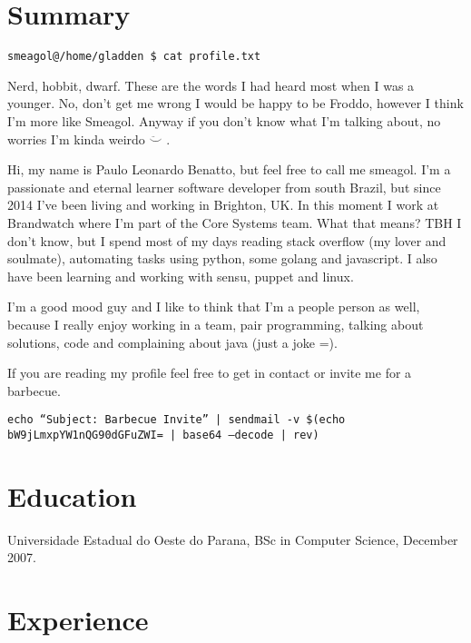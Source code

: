 \documentclass[margin]{res}
\begin{document}
  

\address{Brighton, UK \\ benatto@gmail.com \\ Phone: +44 07533998484 \\ Post Code: BN1 6AQ }

                        
\begin{resume}                        

\section{Summary} \texttt{smeagol@/home/gladden \$ cat profile.txt}

Nerd, hobbit, dwarf. These are the words I had heard most when I was a younger.
No, don't get me wrong I would be happy to be Froddo, however I think I'm more
like Smeagol. Anyway if you don't know what I'm talking about, no worries
I'm kinda weirdo $\ddot\smile$ .

Hi, my name is Paulo Leonardo Benatto, but feel free to call me smeagol.
I'm a passionate and eternal learner software developer from south Brazil, but since 2014 I've been
living and working in Brighton, UK. In this moment I work at Brandwatch where
I'm part of the Core Systems team. What that means? TBH I don't know, but I spend
most of my days reading stack overflow (my lover and soulmate), automating
tasks using python, some golang and javascript. I also have been learning and
working with sensu, puppet and linux.

I'm a good mood guy and I like to think that I'm a people person as well,
because I really enjoy working in a team, pair programming, talking about
solutions, code and complaining about java (just a joke =).

If you are reading my profile feel free to get in contact or invite me for a barbecue.

\texttt{echo ``Subject: Barbecue Invite'' | sendmail -v \$(echo bW9jLmxpYW1nQG90dGFuZWI= | base64 --decode | rev)}

\section{Education}	Universidade Estadual do Oeste do Parana, BSc in Computer Science, December 2007.
  
\section{Experience}


\end{resume}
\end{document}
